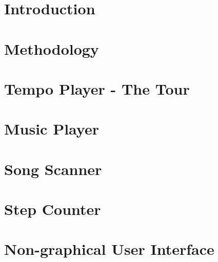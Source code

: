 



\frontmatter 

\cleardoublepage

\cleardoublepage

\cleardoublepage


\mainmatter



\chapter{Introduction}
\label{chap:intro}


\chapter{Methodology}
\label{chap:methodology}


\chapter{Tempo Player - The Tour}
\label{chap:tempoPlayer}


\chapter{Music Player}
\label{chap:musicPlayer}


\chapter{Song Scanner}
\label{chap:songScanner}


\chapter{Step Counter}
\label{chap:stepCounter}


\chapter{Non-graphical User Interface}
\label{chap:tactileInterface}


